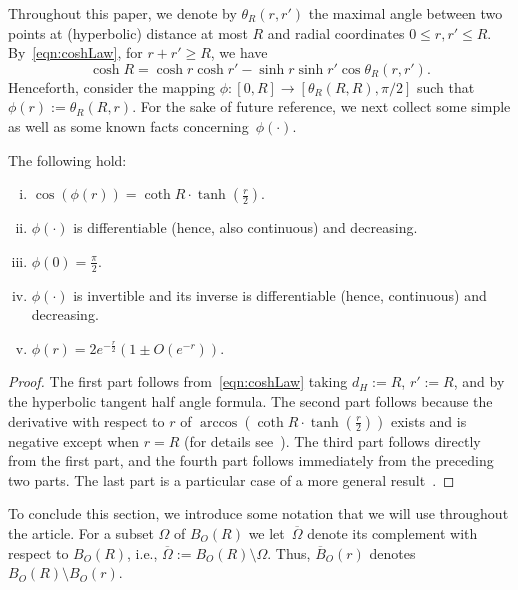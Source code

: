 

\medskip
Throughout this paper, we denote by $\theta_R(r,r')$ the maximal angle between two points at (hyperbolic) distance at most $R$ and radial coordinates  $0\leq r,r'\leq R$. By~\eqref{eqn:coshLaw}, for $r+r'\geq R$, we have
\begin{equation}\label{eqn:angle}
\cosh R = \cosh r\cosh r'-\sinh r\sinh r'\cos \theta_R(r,r').
\end{equation}
Henceforth, consider the mapping $\phi:[0,R]\to [\theta_R(R,R),\pi/2]$ such that $\phi(r):=\theta_R(R,r)$.
For the sake of future reference, we next collect some simple as well as some known facts concerning~$\phi(\cdot)$.
\begin{lemma}\label{lem:phi}
The following hold:
\begin{enumerate}[(i)]
\item\label{itm:phi1} $\cos(\phi(r))=\coth R\cdot\tanh(\frac{r}{2})$.
\item\label{itm:phi2} $\phi(\cdot)$ is differentiable (hence, also continuous) and decreasing.
\item\label{itm:phi3} $\phi(0)=\frac{\pi}{2}$.
\item\label{itm:phiInv} $\phi(\cdot)$ is invertible and its inverse is differentiable (hence, continuous) and decreasing.
\item\label{itm:phi4} $\phi(r)=2e^{-\frac{r}{2}}(1\pm O(e^{-r}))$. 
\end{enumerate}
\end{lemma}
\begin{proof}
The first part follows from~\eqref{eqn:coshLaw} taking $d_H:=R$, $r':=R$, and by the hyperbolic tangent half angle formula. 
The second part follows because the derivative with respect to $r$ of $\arccos(\coth R\cdot\tanh(\frac{r}{2}))$
exists and is negative except when $r=R$ (for details see~\cite[Remark 2.1]{km19}).
The third part follows directly from the first part, and the fourth part follows immediately from
the preceding two parts.
The last part is a particular case of a more general result~\cite[Lemma 3.1]{GPP12}.
\end{proof}

\medskip
To conclude this section, we introduce some notation that we will use throughout the article. For a subset $\Omega$ of $B_O(R)$ we let~$\overline{\Omega}$ denote its complement with respect to $B_O(R)$, i.e., $\overline{\Omega}:=B_{O}(R)\setminus\Omega$.
Thus, $\overline{B}_O(r)$ denotes $B_{O}(R)\setminus B_O(r)$. 